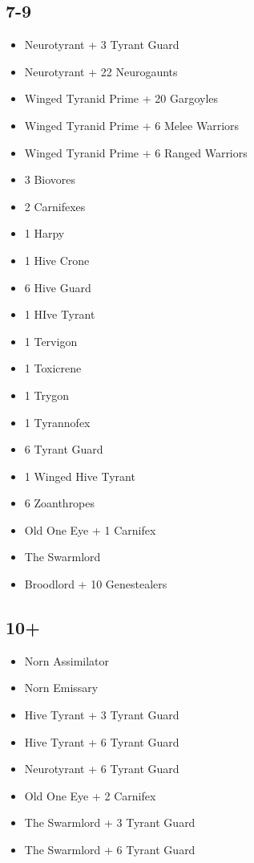 \documentclass{HordeModeTarot}
\begin{document}
\begin{multicols}{2}
\subsection*{7-9}

\begin{itemize}[leftmargin=*]
\item[] Neurotyrant + 3 Tyrant Guard
\item[] Neurotyrant + 22 Neurogaunts
\item[] Winged Tyranid Prime + 20 Gargoyles
\item[] Winged Tyranid Prime + 6 Melee Warriors
\item[] Winged Tyranid Prime + 6 Ranged Warriors
\item[] 3 Biovores
\item[] 2 Carnifexes
\item[] 1 Harpy
\item[] 1 Hive Crone
\item[] 6 Hive Guard
\item[] 1 HIve Tyrant
\item[] 1 Tervigon
\item[] 1 Toxicrene
\item[] 1 Trygon
\item[] 1 Tyrannofex
\item[] 6 Tyrant Guard
\item[] 1 Winged Hive Tyrant
\item[] 6 Zoanthropes
\item[] Old One Eye + 1 Carnifex
\item[] The Swarmlord
\item[] Broodlord + 10 Genestealers
\end{itemize}

\subsection*{10+}

\begin{itemize}[leftmargin=*]
\item[] Norn Assimilator
\item[] Norn Emissary
\item[] Hive Tyrant + 3 Tyrant Guard
\item[] Hive Tyrant + 6 Tyrant Guard
\item[] Neurotyrant + 6 Tyrant Guard
\item[] Old One Eye + 2 Carnifex
\item[] The Swarmlord + 3 Tyrant Guard
\item[] The Swarmlord + 6 Tyrant Guard
\end{itemize}


\end{multicols}
\end{document}
